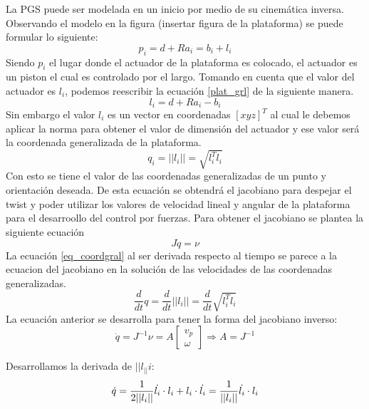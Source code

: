 La PGS puede ser modelada en un inicio por medio de su cinemática inversa. Observando el modelo en la figura (insertar figura de la plataforma) se puede formular lo siguiente:
\begin{equation} \label{plat_grl}
p_i = d + Ra_i = b_i + l_i
\end{equation}
Siendo $p_i$ el lugar donde el actuador de la plataforma es colocado, el actuador es un piston el cual es controlado por el largo. Tomando en cuenta que el valor del actuador es $l_i$, podemos reescribir la ecuación \ref{plat_grl} de la siguiente manera.
\begin{equation}
l_i = d + Ra_i - b_i
\end{equation}
Sin embargo el valor $l_i$ es un vector en coordenadas $[x y z]^T$ al cual le debemos aplicar la norma para obtener el valor de dimensión del actuador y ese valor será la coordenada generalizada de la plataforma.
\begin{equation}\label{eq_coordgral}
q_i = ||l_i|| = \sqrt{l_i^Tl_i}
\end{equation}
Con esto se tiene el valor de las coordenadas generalizadas de un punto y orientación deseada. De esta ecuación se obtendrá el jacobiano para despejar el twist y poder utilizar los valores de velocidad lineal y angular de la plataforma para el desarroollo del control por fuerzas. Para obtener el jacobiano se plantea la siguiente ecuación
\begin{equation} \label{equgral_q}
J\dot{q}=\nu
\end{equation}
La ecuación \ref{eq_coordgral} al ser derivada respecto al tiempo se parece a la ecuacion del jacobiano en la solución de las velocidades de las coordenadas generalizadas.
\begin{equation}
\frac{d}{dt}q = \frac{d}{dt}||l_i|| = \frac{d}{dt}\sqrt{l_i^Tl_i} 
\end{equation}
La ecuación anterior se desarrolla para tener la forma del jacobiano inverso:
\begin{equation}
\dot{q}=J^{-1} \nu = A \begin{bmatrix}
v_p\\
\omega
\end{bmatrix} \Rightarrow A = J^{-1}
\end{equation}

Desarrollamos la derivada de $||l_||i$:
\begin{equation}
\dot{q} = \frac{1}{2||l_i||} \dot{l_i} \cdot l_i + l_i \cdot \dot{l_i} = \frac{1}{||l_i||} \dot{l_i} \cdot l_i \\ \bigskip
\end{equation}

